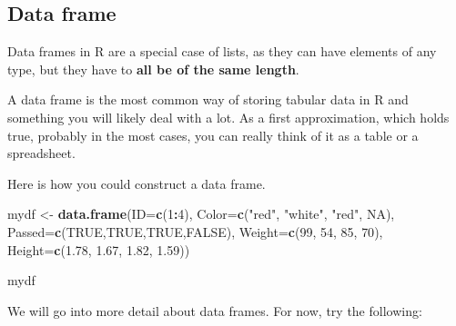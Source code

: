 \documentclass[
]{book}
\newenvironment{Shaded}{\begin{snugshade}}{\end{snugshade}}
\newcommand{\AttributeTok}[1]{\textcolor[rgb]{0.13,0.29,0.53}{#1}}
\newcommand{\ConstantTok}[1]{\textcolor[rgb]{0.56,0.35,0.01}{#1}}
\newcommand{\DecValTok}[1]{\textcolor[rgb]{0.00,0.00,0.81}{#1}}
\newcommand{\FloatTok}[1]{\textcolor[rgb]{0.00,0.00,0.81}{#1}}
\newcommand{\FunctionTok}[1]{\textcolor[rgb]{0.13,0.29,0.53}{\textbf{#1}}}
\newcommand{\NormalTok}[1]{#1}
\newcommand{\OtherTok}[1]{\textcolor[rgb]{0.56,0.35,0.01}{#1}}
\newcommand{\SpecialCharTok}[1]{\textcolor[rgb]{0.81,0.36,0.00}{\textbf{#1}}}
\newcommand{\StringTok}[1]{\textcolor[rgb]{0.31,0.60,0.02}{#1}}
\begin{document}
\subsection{Data frame}\label{data-frame}

Data frames in R are a special case of lists, as they can have elements of any type, but they have to \textbf{all be of the same length}.

A data frame is the most common way of storing tabular data in R and something you will likely deal with a lot. As a first approximation, which holds true, probably in the most cases, you can really think of it as a table or a spreadsheet.

Here is how you could construct a data frame.

\begin{Shaded}
\begin{Highlighting}[]
\NormalTok{mydf }\OtherTok{\textless{}{-}} \FunctionTok{data.frame}\NormalTok{(}\AttributeTok{ID=}\FunctionTok{c}\NormalTok{(}\DecValTok{1}\SpecialCharTok{:}\DecValTok{4}\NormalTok{),}
                   \AttributeTok{Color=}\FunctionTok{c}\NormalTok{(}\StringTok{"red"}\NormalTok{, }\StringTok{"white"}\NormalTok{, }\StringTok{"red"}\NormalTok{, }\ConstantTok{NA}\NormalTok{),}
                   \AttributeTok{Passed=}\FunctionTok{c}\NormalTok{(}\ConstantTok{TRUE}\NormalTok{,}\ConstantTok{TRUE}\NormalTok{,}\ConstantTok{TRUE}\NormalTok{,}\ConstantTok{FALSE}\NormalTok{),}
                   \AttributeTok{Weight=}\FunctionTok{c}\NormalTok{(}\DecValTok{99}\NormalTok{, }\DecValTok{54}\NormalTok{, }\DecValTok{85}\NormalTok{, }\DecValTok{70}\NormalTok{),}
                   \AttributeTok{Height=}\FunctionTok{c}\NormalTok{(}\FloatTok{1.78}\NormalTok{, }\FloatTok{1.67}\NormalTok{, }\FloatTok{1.82}\NormalTok{, }\FloatTok{1.59}\NormalTok{))}

\NormalTok{mydf}
\end{Highlighting}
\end{Shaded}

We will go into more detail about data frames. For now, try the following:
\end{document}
